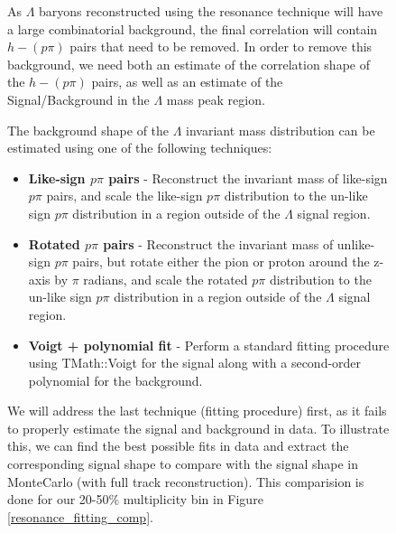 \documentclass[ALICE,manyauthors]{ALICE_analysis_notes}
\begin{document}
\begin{figure}[ht]
As $\Lambda$ baryons reconstructed using the resonance technique will have a large combinatorial background, the final correlation will contain $h-(p\pi)$ pairs that need to be removed. In order to remove this background, we need both an estimate of the correlation shape of the $h-(p\pi)$ pairs, as well as an estimate of the Signal/Background in the $\Lambda$ mass peak region.

 The background shape of the $\Lambda$ invariant mass distribution can be estimated using one of the following techniques:

 \begin{itemize}
	\item \textbf{Like-sign $p\pi$ pairs} - Reconstruct the invariant mass of like-sign $p\pi$ pairs, and scale the like-sign $p\pi$ distribution to the un-like sign $p\pi$ distribution in a region outside of the $\Lambda$ signal region.
	\item \textbf{Rotated $p\pi$ pairs} - Reconstruct the invariant mass of unlike-sign $p\pi$ pairs, but rotate either the pion or proton around the z-axis by $\pi$ radians, and scale the rotated $p\pi$ distribution to the un-like sign $p\pi$ distribution in a region outside of the $\Lambda$ signal region.
	\item \textbf{Voigt + polynomial fit} - Perform a standard fitting procedure using TMath::Voigt for the signal along with a second-order polynomial for the background.
 \end{itemize}

We will address the last technique (fitting procedure) first, as it fails to properly estimate the signal and background in data. To illustrate this, we can find the best possible fits in data and extract the corresponding signal shape to compare with the signal shape in MonteCarlo (with full track reconstruction). This comparision is done for our 20-50\% multiplicity bin in Figure \ref{resonance_fitting_comp}.


\end{figure}
\end{document}
